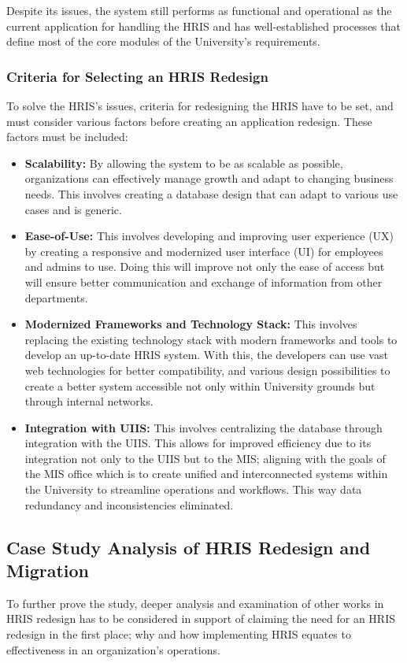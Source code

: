        Despite its issues, the system still performs as functional and operational as the current application for handling the HRIS and has well-established processes that define most of the core modules of the University's requirements. 
        
        \subsubsection{Criteria for Selecting an HRIS Redesign}
        To solve the HRIS's issues, criteria for redesigning the HRIS have to be set, and must consider various factors before creating an application redesign. These factors must be included:

        \begin{itemize}
            \item[] \textbf{Scalability:} By allowing the system to be as scalable as possible, organizations can effectively manage growth and adapt to changing business needs. This involves creating a database design that can adapt to various use cases and is generic. 
            \item[] \textbf{Ease-of-Use:} This involves developing and improving user experience (UX) by creating a responsive and modernized user interface (UI) for employees and admins to use. Doing this will improve not only the ease of access but will ensure better communication and exchange of information from other departments.
            \item[] \textbf{Modernized Frameworks and Technology Stack:} This involves replacing the existing technology stack with modern frameworks and tools to develop an up-to-date HRIS system. With this, the developers can use vast web technologies for better compatibility, and various design possibilities to create a better system accessible not only within University grounds but through internal networks.
            \item[] \textbf{Integration with UIIS:} This involves centralizing the database through integration with the UIIS. This allows for improved efficiency due to its integration not only to the UIIS but to the MIS; aligning with the goals of the MIS office which is to create unified and interconnected systems within the University to streamline operations and workflows. This way data redundancy and inconsistencies eliminated.
        \end{itemize}
    
    \subsection{Case Study Analysis of HRIS Redesign and Migration}
    To further prove the study, deeper analysis and examination of other works in HRIS redesign has to be considered in support of claiming the need for an HRIS redesign in the first place; why and how implementing HRIS equates to effectiveness in an organization's operations.
    
